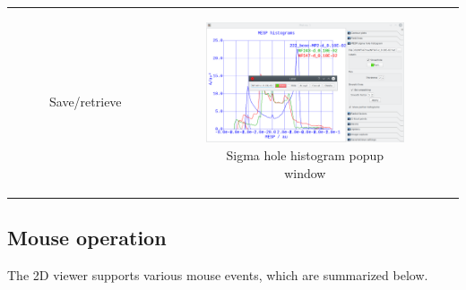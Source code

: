 \documentclass[10pt]{article}
\begin{document}
\begin{tabular}{lcr}
\begin{minipage}{.3\linewidth}
\begin{figure}[H]
\begin{center}
        \end{center}
        \vspace*{-1mm}
        \caption{Save/retrieve \label{fig:3_11}}
    \end{figure}
\end{minipage}
&
\begin{minipage}{.3\linewidth}
    \begin{figure}[H]
        \begin{center}
            \vspace*{3mm}
            \includegraphics[width=1.2\linewidth]{damqt320_sghist_popup.png}
        \end{center}
        \caption{Sigma hole histogram popup window\label{fig:3_12a}}
    \end{figure}
\end{minipage}
\end{tabular}


\subsection{Mouse operation\label{sec:3.10}}

The 2D viewer supports various mouse events,  
which are summarized below.  
\end{document}
